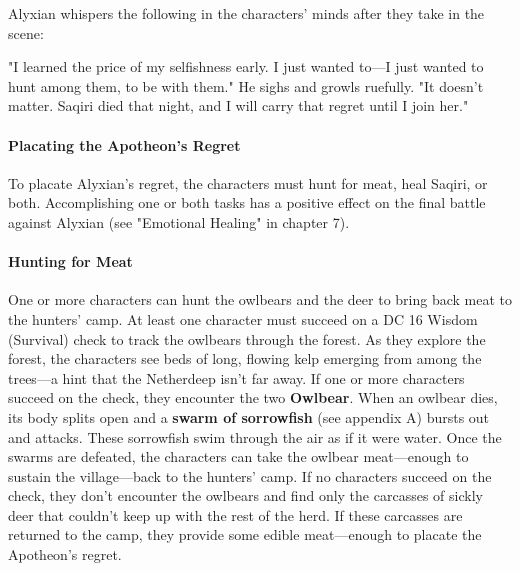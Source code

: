 \documentclass[10pt,a4,twoside,twocolumn,openany,nodeprecatedcode]{dndbook}
\begin{document}
Alyxian whispers the following in the characters' minds after they take in the scene:
\begin{DndReadAloud}{}
"I learned the price of my selfishness early. I just wanted to—I just wanted to hunt among them, to be with them." He sighs and growls ruefully. "It doesn't matter. Saqiri died that night, and I will carry that regret until I join her."
\end{DndReadAloud}

\paragraph{Placating the Apotheon's Regret}
To placate Alyxian's regret, the characters must hunt for meat, heal Saqiri, or both. Accomplishing one or both tasks has a positive effect on the final battle against Alyxian (see "Emotional Healing" in chapter 7).
\paragraph{Hunting for Meat}
One or more characters can hunt the owlbears and the deer to bring back meat to the hunters' camp. At least one character must succeed on a DC 16 Wisdom (Survival) check to track the owlbears through the forest. As they explore the forest, the characters see beds of long, flowing kelp emerging from among the trees—a hint that the Netherdeep isn't far away. If one or more characters succeed on the check, they encounter the two \textbf{Owlbear}. When an owlbear dies, its body splits open and a \textbf{swarm of sorrowfish} (see appendix A) bursts out and attacks. These sorrowfish swim through the air as if it were water. Once the swarms are defeated, the characters can take the owlbear meat—enough to sustain the village—back to the hunters' camp. If no characters succeed on the check, they don't encounter the owlbears and find only the carcasses of sickly deer that couldn't keep up with the rest of the herd. If these carcasses are returned to the camp, they provide some edible meat—enough to placate the Apotheon's regret.
\end{document}

